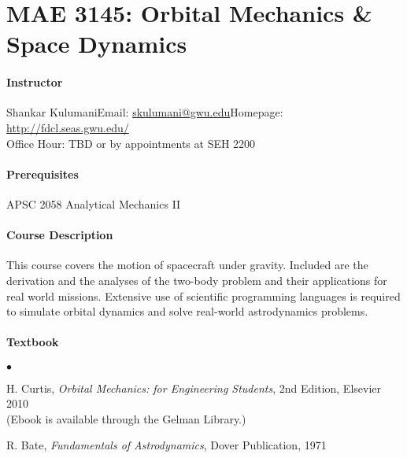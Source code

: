 \documentclass[10pt]{article}
\date{}
\begin{document}
\pagestyle{empty}
\section*{MAE 3145: Orbital Mechanics \& Space Dynamics}
\vspace*{-0.4cm}


\paragraph*{Instructor}
Shankar Kulumani\quad Email: \href{mailto:skulumani@gwu.edu}{skulumani@gwu.edu}\quad Homepage: \url{http://fdcl.seas.gwu.edu/}\\
\hspace*{1.8cm}
Office Hour: TBD or by appointments at SEH 2200


\paragraph*{Prerequisites} APSC 2058 Analytical Mechanics II

\paragraph*{Course Description} This course covers the motion of spacecraft under gravity. Included are the derivation and the analyses of the two-body problem and their applications for real world missions.
Extensive use of scientific programming languages is required to simulate orbital dynamics and solve real-world astrodynamics problems.

\paragraph*{Textbook}
\begin{list}{$\bullet$}{\setlength{\itemsep}{-3pt}}\item 
H. Curtis, \textit{Orbital Mechanics: for Engineering Students}, 2nd Edition, Elsevier 2010\\
(Ebook is available through the Gelman Library.)
\item R. Bate, \textit{Fundamentals of Astrodynamics}, Dover Publication, 1971
\end{list}
\end{document}
